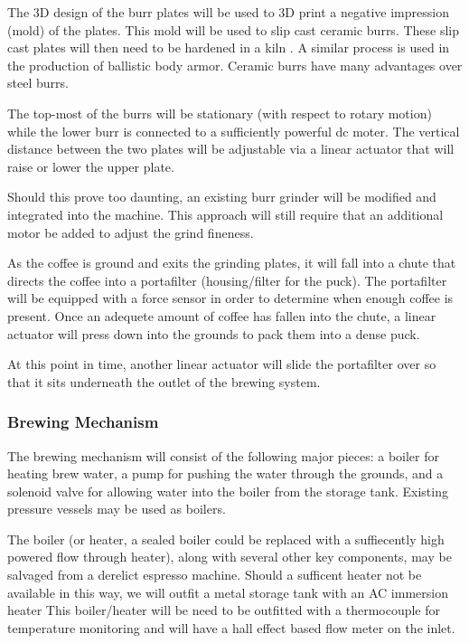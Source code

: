 \documentclass[conference]{IEEEtran}
\begin{document}
The 3D design of the burr plates will be used to 3D print a negative impression (mold) of the plates.
This mold will be used to slip cast
ceramic burrs. These slip cast plates will then need
to be hardened in a kiln \cite{slip}. A similar process is used in the
production of ballistic body armor. Ceramic burrs have many advantages over steel burrs.

The top-most of the burrs will be stationary (with respect to rotary motion)
while the lower burr is connected to a sufficiently powerful dc moter. The
vertical distance between the two plates will be adjustable via a linear
actuator that will raise or lower the upper plate.

Should this prove too daunting, an existing burr grinder will be modified
and integrated into the machine. This approach will still require that an additional
motor be added to adjust the grind fineness.

As the coffee is ground and exits the grinding plates, it will fall into a chute
that directs the coffee into a portafilter (housing/filter for the puck). The
portafilter will be equipped with a force sensor in order to determine when
enough coffee is present. Once an adequete amount of coffee has fallen into the
chute, a linear actuator will press down into the grounds to pack them into a dense puck.

At this point in time, another linear actuator will slide the portafilter over
so that it sits underneath the outlet of the brewing system.

\subsubsection{Brewing Mechanism}
The brewing mechanism will consist of the following major pieces: a boiler for
heating brew water, a pump for pushing the water
through the grounds, and a solenoid valve for allowing water into the boiler from the storage tank.
Existing pressure vessels may be used as boilers.


The boiler (or heater, a sealed boiler could be replaced with a suffiecently
high powered flow through heater), along with several other key components, may
be salvaged from a derelict espresso machine. Should a sufficent heater not be
available in this way, we will outfit a metal storage tank with an AC immersion
heater  This boiler/heater will be need to be outfitted with a thermocouple for
temperature monitoring and will have a hall effect based flow meter on the inlet.
\end{document}
